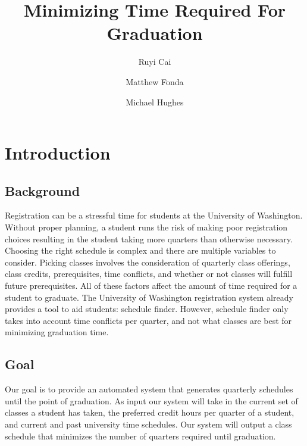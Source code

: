 \documentclass[11pt]{article} %
\title{Minimizing Time Required For Graduation}
\author{Ruyi Cai \and Matthew Fonda \and Michael Hughes}
\begin{document}
\maketitle

\pagebreak


\section{Introduction} \subsection{Background} Registration can be a stressful 
time for students at the University of Washington.  Without proper planning,
a student runs the risk of making poor registration choices resulting
in the student taking more quarters than otherwise necessary.
Choosing the right schedule is complex and there are multiple variables to
consider.  Picking classes involves the consideration of quarterly class
offerings, class credits, prerequisites, time conflicts, and whether or not 
classes will fulfill future prerequisites.  All of these factors affect the amount
of time required for a student to graduate.  The University of Washington registration
system already provides a tool to aid students: schedule finder.  However, schedule
finder only takes into account time conflicts per quarter, and not what classes are
best for minimizing graduation time.

\subsection{Goal} Our goal is to provide an automated system that generates quarterly
schedules until the point of graduation.  As input our system will take in
the current set of classes a student has taken, the preferred credit hours
per quarter of a student, and current and past university time schedules.
Our system will output a class schedule that minimizes the
number of quarters required until graduation.
\end{document}
